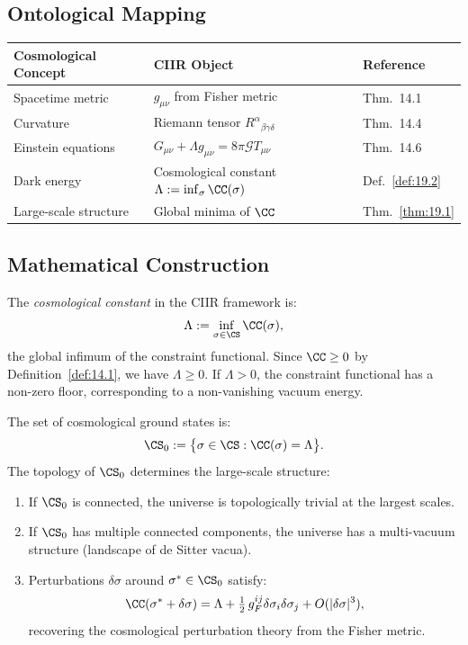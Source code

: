 \subsection{Ontological Mapping}

\begin{center}
\begin{tabular}{lll}
\toprule
\textbf{Cosmological Concept} & \textbf{CIIR Object} & \textbf{Reference} \\
\midrule
Spacetime metric & $g_{\mu\nu}$ from Fisher metric & Thm.~14.1 \\
Curvature & Riemann tensor $R^\alpha{}_{\beta\gamma\delta}$ & Thm.~14.4 \\
Einstein equations & $G_{\mu\nu} + \Lambda g_{\mu\nu} = 8\pi \mathcal{G} T_{\mu\nu}$ & Thm.~14.6 \\
Dark energy & Cosmological constant $\Lambda := \inf_\sigma \CC(\sigma)$ & Def.~\ref{def:19.2} \\
Large-scale structure & Global minima of $\CC$ & Thm.~\ref{thm:19.1} \\
\bottomrule
\end{tabular}
\end{center}

\subsection{Mathematical Construction}

\begin{definition}\label{def:19.2}
The \emph{cosmological constant} in the CIIR framework is:
\[
  \Lambda := \inf_{\sigma \in \CS} \CC(\sigma),
\]
the global infimum of the constraint functional.  Since $\CC \geq 0$
by Definition~\ref{def:14.1}, we have $\Lambda \geq 0$.  If $\Lambda > 0$,
the constraint functional has a non-zero floor, corresponding to a
non-vanishing vacuum energy.
\end{definition}

\begin{theorem}\label{thm:19.1}
The set of cosmological ground states is:
\[
  \CS_0 := \bigl\{ \sigma \in \CS : \CC(\sigma) = \Lambda \bigr\}.
\]
The topology of $\CS_0$ determines the large-scale structure:
\begin{enumerate}
  \item[\textup{(i)}] If $\CS_0$ is connected, the universe is
    topologically trivial at the largest scales.
  \item[\textup{(ii)}] If $\CS_0$ has multiple connected components,
    the universe has a multi-vacuum structure
    (landscape of de Sitter vacua).
  \item[\textup{(iii)}] Perturbations $\delta\sigma$ around
    $\sigma^* \in \CS_0$ satisfy:
    \[
      \CC(\sigma^* + \delta\sigma)
      = \Lambda + \tfrac{1}{2}\, g_F^{ij} \delta\sigma_i \delta\sigma_j
      + O(|\delta\sigma|^3),
    \]
    recovering the cosmological perturbation theory from the
    Fisher metric.
\end{enumerate}
\end{theorem}

